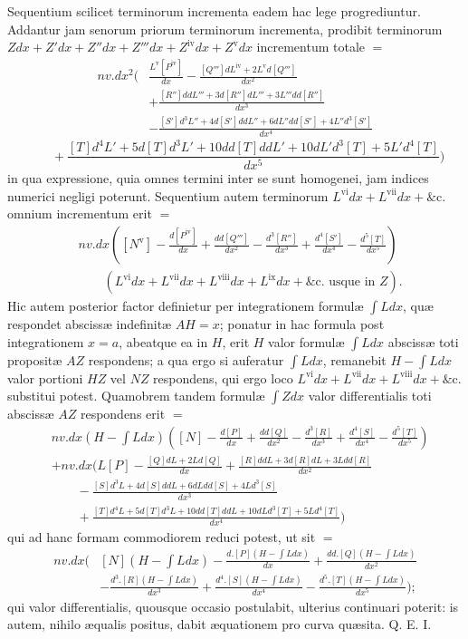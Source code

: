 Sequentium scilicet terminorum incrementa eadem hac lege progrediuntur. Addantur jam senorum priorum terminorum incrementa, prodibit terminorum $Zdx+Z'dx+Z''dx+Z'''dx+Z^{\mathrm{iv}}dx+Z^{\mathrm{v}}dx$ incrementum totale $=$
\[\begin{aligned}
nv.dx^2\bigg(&\frac{L^{\mathrm{v}}[P^{\mathrm{iv}}]}{dx}-\frac{[Q''']dL^{\mathrm{iv}}+2L^{\mathrm{v}}d[Q''']}{dx^2}\\&+\frac{[R'']ddL'''+3d[R'']dL'''+3L'''dd[R'']}{dx^3}\\&-\frac{[S']d^3L''+4d[S']ddL''+6dL''dd[S']+4L''d^3[S']}{dx^4}
\end{aligned}\]
\[\qquad+\frac{[T]d^4L'+5d[T]d^3L'+10dd[T]ddL'+10dL'd^3[T]+5L'd^4[T]}{dx^5}\bigg)\]
in qua expressione, quia omnes termini inter se sunt homogenei, jam indices numerici negligi poterunt. Sequentium autem terminorum $L^{\mathrm{vi}}dx+L^{\mathrm{vii}}dx+\text{\&c.}$ omnium incrementum erit $=$
\[\begin{aligned}
&nv.dx\left([N^{\mathrm{v}}]-\frac{d[P^{\mathrm{iv}}]}{dx}+\frac{dd[Q''']}{dx^2}-\frac{d^3[R'']}{dx^3}+\frac{d^4[S']}{dx^4}-\frac{d^5[T]}{dx^5}\right)\\
&\qquad(L^{\mathrm{vi}}dx+L^{\mathrm{vii}}dx+L^{\mathrm{viii}}dx+L^{\mathrm{ix}}dx+\text{\&c. usque in }Z).
\end{aligned}\]
Hic autem posterior factor definietur per integrationem formulæ $\int Ldx$, quæ respondet abscissæ indefinitæ $AH=x$; ponatur in hac formula post integrationem $x=a$, abeatque ea in $H$, erit $H$ valor formulæ $\int Ldx$ abscissæ toti propositæ $AZ$ respondens; a qua ergo si auferatur $\int Ldx$, remanebit $H-\int Ldx$ valor portioni $HZ$ vel $NZ$ respondens, qui ergo loco $L^{\mathrm{vi}}dx+L^{\mathrm{vii}}dx+L^{\mathrm{viii}}dx+\text{\&c.}$ substitui potest. Quamobrem tandem formulæ $\int Zdx$ valor differentialis toti abscissæ $AZ$ respondens erit $=$
\[\begin{aligned}
&nv.dx(H-\int Ldx)\left([N]-\frac{d[P]}{dx}+\frac{dd[Q]}{dx^2}-\frac{d^3[R]}{dx^3}+\frac{d^4[S]}{dx^4}-\frac{d^5[T]}{dx^5}\right)\\
&+nv.dx\bigg(L[P]-\frac{[Q]dL+2Ld[Q]}{dx}+\frac{[R]ddL+3d[R]dL+3Ldd[R]}{dx^2}\\
&\qquad-\frac{[S]d^3L+4d[S]ddL+6dLdd[S]+4Ld^3[S]}{dx^3}\\
&\qquad+\frac{[T]d^4L+5d[T]d^3L+10dd[T]ddL+10dLd^3[T]+5Ld^4[T]}{dx^4}\bigg)
\end{aligned}\]
qui ad hanc formam commodiorem reduci potest, ut sit $=$
\[\begin{aligned}
nv.dx\bigg(&[N](H-\int Ldx)-\frac{d.[P](H-\int Ldx)}{dx}+\frac{dd.[Q](H-\int Ldx)}{dx^2}\\
&-\frac{d^3.[R](H-\int Ldx)}{dx^3}+\frac{d^4.[S](H-\int Ldx)}{dx^4}-\frac{d^5.[T](H-\int Ldx)}{dx^5}\bigg);
\end{aligned}\]
qui valor differentialis, quousque occasio postulabit, ulterius continuari poterit: is autem, nihilo æqualis positus, dabit æquationem pro curva quæsita. Q. E. I.
